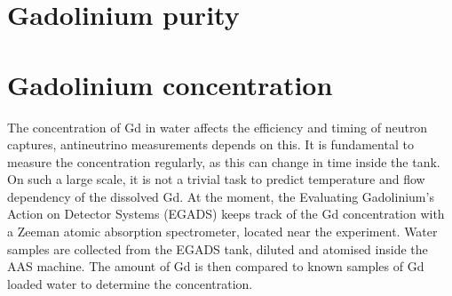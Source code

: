 \section{Gadolinium purity}

\section{Gadolinium concentration}

The concentration of Gd in water affects the efficiency and timing of neutron captures, antineutrino measurements depends on this.
It is fundamental to measure the concentration regularly, as this can change in time inside the tank.
On such a large scale, it is not a trivial task to predict temperature and flow dependency of the dissolved Gd.
At the moment, the Evaluating Gadolinium's Action on Detector Systems (EGADS) keeps track of the Gd concentration
with a Zeeman atomic absorption spectrometer, located near the experiment.
Water samples are collected from the EGADS tank, diluted and atomised inside the AAS machine.
The amount of Gd is then compared to known samples of Gd loaded water to determine the concentration.

